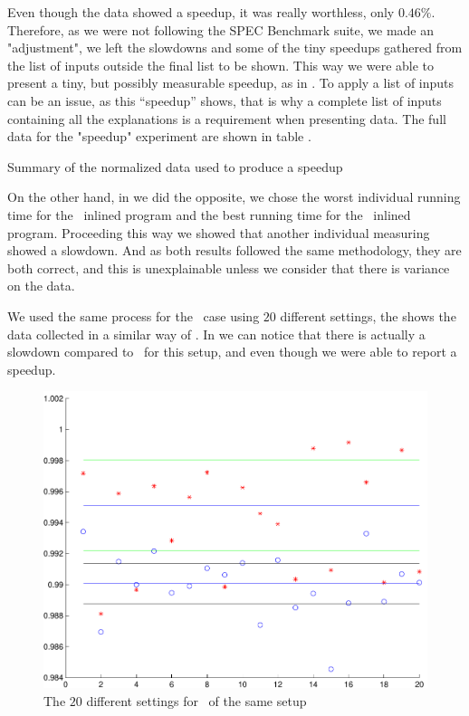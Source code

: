 Even though the data showed a speedup, it was really worthless, only $0.46 \%$. Therefore, as we were not following the SPEC Benchmark suite, we made an "adjustment", we left the slowdowns and some of the tiny speedups gathered from the list of inputs outside the final list to be shown. This way we were able to present a tiny, but possibly measurable speedup, as in . To apply a list of inputs can be an issue, as this ``speedup'' shows, that is why a complete list of inputs containing all the explanations is a requirement when presenting data. The full data for the "speedup" experiment are shown in table .

\begin{table}
  \centering
  \begin{tiny}
  
  \end{tiny}
  \caption{Summary of the normalized data used to produce a speedup}
  \label{tab:fullexp}
\end{table}

On the other hand, in  we did the opposite, we chose the worst individual running time for the \FDI\ inlined program and the best running time for the \llvm\ inlined program. Proceeding this way we showed that another individual measuring showed a slowdown. And as both results followed the same methodology, they are both correct, and this is unexplainable unless we consider that there is variance on the data.

We used the same process for the \gzip\ case using $20$ different settings, the  shows the data collected in a similar way of . In  we can notice that there is actually a slowdown compared to \llvm\ for this setup, and even though we were able to report a speedup.

\begin{figure}
  \centering
  \includegraphics[width=1.00\linewidth]{Figures/gzipfdll}
  \caption{The $20$ different settings for \gzip\ of the same setup}
  \label{fig:gzipfdll}
\end{figure}

